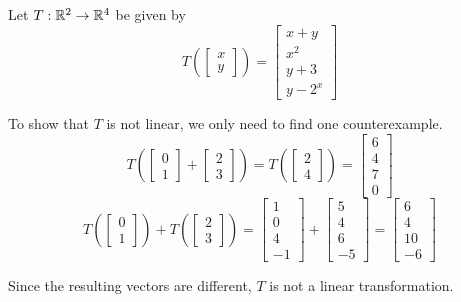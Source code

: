 \begin{example}
Let \(T : \mathbb{R}^2 \rightarrow \mathbb{R}^4\) be given by
\[
  T\left(\begin{bmatrix} x \\ y \end{bmatrix} \right)
=
  \begin{bmatrix} x+y \\ x^2 \\ y+3 \\ y-2^x \end{bmatrix}
\]

To show that \(T\) is not linear, we only need to find one
counterexample.
\[
  T\left(
    \begin{bmatrix} 0 \\ 1 \end{bmatrix} +
    \begin{bmatrix} 2 \\ 3 \end{bmatrix}
  \right)
=
  T\left(
    \begin{bmatrix} 2 \\ 4 \end{bmatrix}
  \right) =
  \begin{bmatrix} 6 \\ 4 \\ 7 \\ 0 \end{bmatrix}
\]
\[
  T\left(
    \begin{bmatrix} 0 \\ 1 \end{bmatrix}
  \right) + T\left(
    \begin{bmatrix} 2 \\ 3\end{bmatrix}
  \right)
=
  \begin{bmatrix} 1 \\ 0 \\ 4 \\ -1 \end{bmatrix} +
  \begin{bmatrix} 5 \\ 4 \\ 6 \\ -5 \end{bmatrix}
=
  \begin{bmatrix} 6 \\ 4 \\ 10 \\ -6 \end{bmatrix}
\]

Since the resulting vectors are different,
\(T\) is not a linear transformation.
\end{example}

